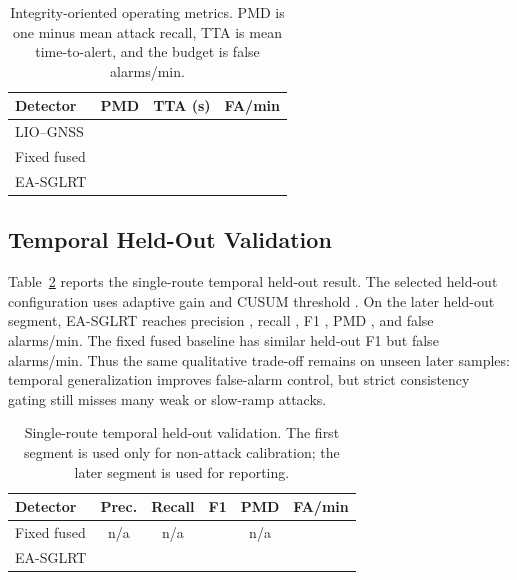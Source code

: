 \documentclass[journal]{IEEEtran}
\begin{document}
\begin{table}[!t]
\centering
\caption{Integrity-oriented operating metrics. PMD is one minus mean attack recall, TTA is mean time-to-alert, and the budget is \AdaptiveSeqFaBudget{} false alarms/min.}
\label{tab:integrity}
\begin{tabular}{lccc}
\toprule
Detector & PMD & TTA (s) & FA/min \\
\midrule
LIO--GNSS & \LioResidualMissedDetectionRate{} & \LioResidualTimeToAlert{} & \LioResidualFalseAlarm{} \\
Fixed fused & \FixedFusedMissedDetectionRate{} & \FixedFusedTimeToAlert{} & \FixedFusedMatrixFalseAlarm{} \\
EA-SGLRT & \AdaptiveSeqMissedDetectionRate{} & \AdaptiveSeqTimeToAlert{} & \AdaptiveSeqFalseAlarm{} \\
\bottomrule
\end{tabular}
\end{table}

\subsection{Temporal Held-Out Validation}
Table~\ref{tab:temporal} reports the single-route temporal held-out result.
The selected held-out configuration uses adaptive gain \TemporalHoldoutAdaptiveGain{} and CUSUM threshold \TemporalHoldoutCusum{}.
On the later held-out segment, EA-SGLRT reaches precision \TemporalHoldoutAdaptivePrecision{}, recall \TemporalHoldoutAdaptiveRecall{}, F1 \TemporalHoldoutAdaptiveFone{}, PMD \TemporalHoldoutAdaptivePmd{}, and \TemporalHoldoutAdaptiveFalseAlarm{} false alarms/min.
The fixed fused baseline has similar held-out F1 \TemporalHoldoutFixedFone{} but \TemporalHoldoutFixedFalseAlarm{} false alarms/min.
Thus the same qualitative trade-off remains on unseen later samples: temporal generalization improves false-alarm control, but strict consistency gating still misses many weak or slow-ramp attacks.

\begin{table}[!t]
\centering
\caption{Single-route temporal held-out validation. The first segment is used only for non-attack calibration; the later segment is used for reporting.}
\label{tab:temporal}
\begin{tabular}{lccccc}
\toprule
Detector & Prec. & Recall & F1 & PMD & FA/min \\
\midrule
Fixed fused & n/a & n/a & \TemporalHoldoutFixedFone{} & n/a & \TemporalHoldoutFixedFalseAlarm{} \\
EA-SGLRT & \TemporalHoldoutAdaptivePrecision{} & \TemporalHoldoutAdaptiveRecall{} & \TemporalHoldoutAdaptiveFone{} & \TemporalHoldoutAdaptivePmd{} & \TemporalHoldoutAdaptiveFalseAlarm{} \\
\bottomrule
\end{tabular}
\end{table}
\end{document}
